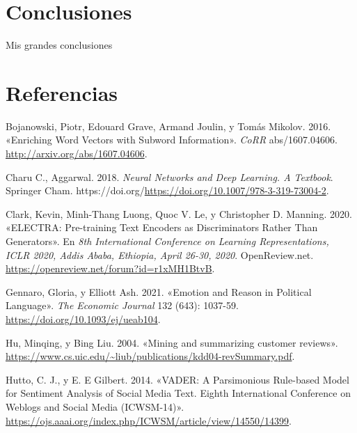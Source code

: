 \documentclass[
  12pt,
]{article}
\newlength{\cslhangindent}
\newlength{\cslentryspacingunit} %
\newenvironment{CSLReferences}[2] %
 {%
  \setlength{\parindent}{0pt}
  \ifodd #1
  \let\oldpar\par
  \def\par{\hangindent=\cslhangindent\oldpar}
  \fi
  \setlength{\parskip}{#2\cslentryspacingunit}
 }%
 {}
\begin{document}
\hypertarget{conclusiones}{%
\section{Conclusiones}\label{conclusiones}}

Mis grandes conclusiones

\newpage

\hypertarget{referencias}{%
\section*{Referencias}\label{referencias}}

\hypertarget{refs}{}
\begin{CSLReferences}{1}{0}
\leavevmode{}%
Bojanowski, Piotr, Edouard Grave, Armand Joulin, y Tomás Mikolov. 2016.
{«Enriching Word Vectors with Subword Information»}. \emph{CoRR}
abs/1607.04606. \url{http://arxiv.org/abs/1607.04606}.

\leavevmode{}%
Charu C., Aggarwal. 2018. \emph{Neural Networks and Deep Learning. A
Textbook}. Springer Cham.
https://doi.org/\url{https://doi.org/10.1007/978-3-319-73004-2}.

\leavevmode{}%
Clark, Kevin, Minh-Thang Luong, Quoc V. Le, y Christopher D. Manning.
2020. {«{ELECTRA:} Pre-training Text Encoders as Discriminators Rather
Than Generators»}. En \emph{8th International Conference on Learning
Representations, {ICLR} 2020, Addis Ababa, Ethiopia, April 26-30, 2020}.
OpenReview.net. \url{https://openreview.net/forum?id=r1xMH1BtvB}.

\leavevmode{}%
Gennaro, Gloria, y Elliott Ash. 2021. {«{Emotion and Reason in Political
Language}»}. \emph{The Economic Journal} 132 (643): 1037-59.
\url{https://doi.org/10.1093/ej/ueab104}.

\leavevmode{}%
Hu, Minqing, y Bing Liu. 2004. {«Mining and summarizing customer
reviews»}.
\url{https://www.cs.uic.edu/~liub/publications/kdd04-revSummary.pdf}.

\leavevmode{}%
Hutto, C. J., y E. E Gilbert. 2014. {«VADER: A Parsimonious Rule-based
Model for Sentiment Analysis of Social Media Text. Eighth International
Conference on Weblogs and Social Media (ICWSM-14)»}.
\url{https://ojs.aaai.org/index.php/ICWSM/article/view/14550/14399}.


\end{CSLReferences}
\end{document}
